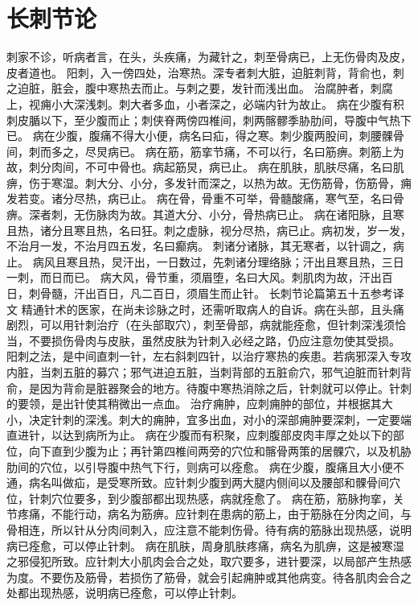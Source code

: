 \documentclass[a4paper,12pt,UTF8,twoside]{ctexbook}
\begin{document}
\chapter{长刺节论}
刺家不诊，听病者言，在头，头疾痛，为藏针之，刺至骨病已，上无伤骨肉及皮，皮者道也。
阳刺，入一傍四处，治寒热。深专者刺大脏，迫脏刺背，背俞也，刺之迫脏，脏会，腹中寒热去而止。与刺之要，发针而浅出血。
治腐肿者，刺腐上，视痈小大深浅刺。刺大者多血，小者深之，必端内针为故止。
病在少腹有积刺皮腯以下，至少腹而止；刺侠脊两傍四椎间，刺两髂髎季胁肋间，导腹中气热下已。
病在少腹，腹痛不得大小便，病名曰疝，得之寒。刺少腹两股间，刺腰髁骨间，刺而多之，尽炅病已。
病在筋，筋挛节痛，不可以行，名曰筋痹。刺筋上为故，刺分肉间，不可中骨也。病起筋炅，病已止。
病在肌肤，肌肤尽痛，名曰肌痹，伤于寒湿。刺大分、小分，多发针而深之，以热为故。无伤筋骨，伤筋骨，痈发若变。诸分尽热，病已止。
病在骨，骨重不可举，骨髓酸痛，寒气至，名曰骨痹。深者刺，无伤脉肉为故。其道大分、小分，骨热病已止。
病在诸阳脉，且寒且热，诸分且寒且热，名曰狂。刺之虚脉，视分尽热，病已止。病初发，岁一发，不治月一发，不治月四五发，名曰癫病。
刺诸分诸脉，其无寒者，以针调之，病止。
病风且寒且热，炅汗出，一日数过，先刺诸分理络脉；汗出且寒且热，三日一刺，而日而已。
病大风，骨节重，须眉堕，名曰大风。刺肌肉为故，汗出百日，刺骨髓，汗出百日，凡二百日，须眉生而止针。
长刺节论篇第五十五参考译文
精通针术的医家，在尚未诊脉之时，还需听取病人的自诉。病在头部，且头痛剧烈，可以用针刺治疗（在头部取穴），刺至骨部，病就能痊愈，但针刺深浅须恰当，不要损伤骨肉与皮肤，虽然皮肤为针刺入必经之路，仍应注意勿使其受损。
阳刺之法，是中间直刺一针，左右斜刺四针，以治疗寒热的疾患。若病邪深入专攻内脏，当刺五脏的募穴；邪气进迫五脏，当刺背部的五脏俞穴，邪气迫脏而针刺背俞，是因为背俞是脏器聚会的地方。待腹中寒热消除之后，针刺就可以停止。针刺的要领，是出针使其稍微出一点血。
治疗痈肿，应刺痈肿的部位，并根据其大小，决定针刺的深浅。刺大的痈肿，宜多出血，对小的深部痈肿要深刺，一定要端直进针，以达到病所为止。
病在少腹而有积聚，应刺腹部皮肉丰厚之处以下的部位，向下直到少腹为止；再针第四椎间两旁的穴位和髂骨两策的居髁穴，以及机胁肋间的穴位，以引导腹中热气下行，则病可以痊愈。
病在少腹，腹痛且大小便不通，病名叫做疝，是受寒所致。应针刺少腹到两大腿内侧间以及腰部和髁骨间穴位，针刺穴位要多，到少腹部都出现热感，病就痊愈了。
病在筋，筋脉拘挛，关节疼痛，不能行动，病名为筋痹。应针刺在患病的筋上，由于筋脉在分肉之间，与骨相连，所以针从分肉间刺入，应注意不能刺伤骨。待有病的筋脉出现热感，说明病已痊愈，可以停止针刺。
病在肌肤，周身肌肤疼痛，病名为肌痹，这是被寒湿之邪侵犯所致。应针刺大小肌肉会合之处，取穴要多，进针要深，以局部产生热感为度。不要伤及筋骨，若损伤了筋骨，就会引起痈肿或其他病变。待各肌肉会合之处都出现热感，说明病已痊愈，可以停止针刺。
\end{document}
